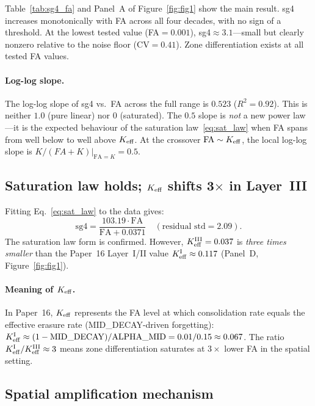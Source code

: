\documentclass[11pt,a4paper]{article}
\begin{document}
Table~\ref{tab:sg4_fa} and Panel~A of Figure~\ref{fig:fig1} show the main result.
sg4 increases monotonically with FA across all four decades, with no sign of
a threshold.  At the lowest tested value (FA$=0.001$), sg4$\approx3.1$---small but
clearly nonzero relative to the noise floor (CV$=0.41$).
Zone differentiation exists at all tested FA values.

\paragraph{Log-log slope.}
The log-log slope of sg4 vs.\ FA across the full range is $0.523$ ($R^2=0.92$).
This is neither $1.0$ (pure linear) nor $0$ (saturated).
The $0.5$ slope is \emph{not} a new power law---it is the expected behaviour
of the saturation law~\eqref{eq:sat_law} when FA spans from well below to
well above $K_{\rm eff}$.
At the crossover $\mathrm{FA}\sim K_{\rm eff}$, the local log-log slope is
$K/(FA+K)|_{\mathrm{FA}=K} = 0.5$.

\subsection{Saturation law holds; $K_{\rm eff}$ shifts 3$\times$ in Layer~III}

Fitting Eq.~\eqref{eq:sat_law} to the data gives:
\begin{equation}
  \mathrm{sg4} = \frac{103.19\cdot\mathrm{FA}}{\mathrm{FA} + 0.0371}
  \quad (\text{residual std} = 2.09).
  \label{eq:fit}
\end{equation}
The saturation law form is confirmed.
However, $K_{\rm eff}^{\rm III} = 0.037$ is \emph{three times smaller} than
the Paper~16 Layer~I/II value $K_{\rm eff}^{\rm I}\approx0.117$
(Panel~D, Figure~\ref{fig:fig1}).

\paragraph{Meaning of $K_{\rm eff}$.}
In Paper~16, $K_{\rm eff}$ represents the FA level at which consolidation
rate equals the effective erasure rate (MID\_DECAY-driven forgetting):
$K_{\rm eff}^{\rm I}\approx(1-\mathrm{MID\_DECAY})/\mathrm{ALPHA\_MID} = 0.01/0.15 \approx 0.067$.
The ratio $K_{\rm eff}^{\rm I}/K_{\rm eff}^{\rm III}\approx3$ means zone differentiation
saturates at $3\times$ lower FA in the spatial setting.

\subsection{Spatial amplification mechanism}
\end{document}
